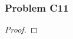 \documentclass[../../../main.tex]{subfiles}
\begin{document}
\subsubsection{Problem C11}
\begin{wts}

\end{wts}
\begin{proof}

\end{proof}
\end{document}
